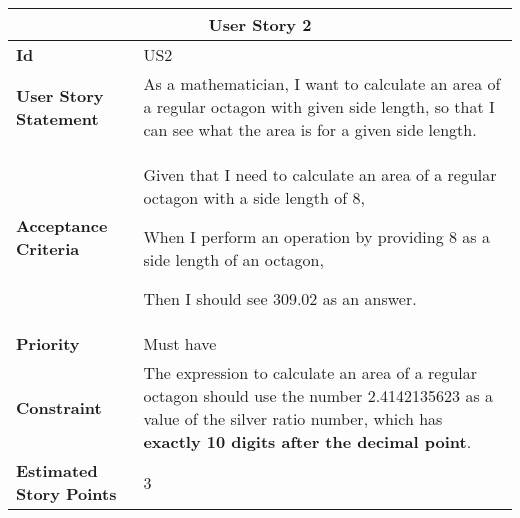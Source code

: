 \hspace{1cm}
\begin{center}
\begin{tabular}{ | m{2.3cm} | m{12cm} | } 

 \hline
 \multicolumn{2}{|c|}{\textbf{User Story 2}} \\

\hline
\textbf{Id} & US2 \\ 

\hline
\textbf{User Story Statement} &  As a mathematician, I want to calculate an area of a regular octagon with given side length, so that I can see what the area is for a given side length.\\ 

\hline
\textbf{Acceptance Criteria} &  
Given that I need to calculate an area of a regular octagon with a side length of 8,

When I perform an operation by providing 8 as a side length of an octagon,

Then I should see 309.02 as an answer.\\ 

\hline
\textbf{Priority} & Must have \\ 

\hline
\textbf{Constraint} & The expression to calculate an area of a regular octagon should use the number 2.4142135623 as a value of the silver ratio number, which has \textbf{exactly 10 digits after the decimal point}.\\ 

\hline
\textbf{Estimated Story Points} & 3 \\
\hline

\end{tabular}
\end{center}

